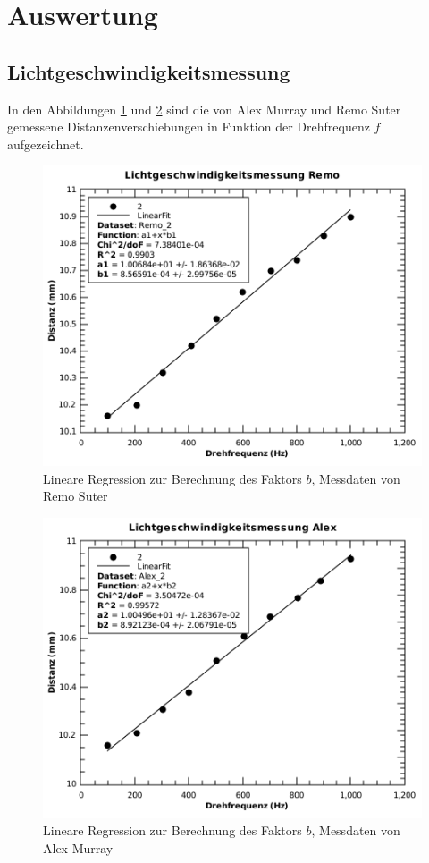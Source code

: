\section{Auswertung}

\subsection{Lichtgeschwindigkeitsmessung}

In den Abbildungen \ref{fig:x-f-remo} und \ref{fig:x-f-alex} sind die von Alex
Murray  und  Remo  Suter  gemessene Distanzenverschiebungen  in  Funktion  der
Drehfrequenz $f$ aufgezeichnet.

\begin{figure}[H]
    \center
    \includegraphics[width=.8\textwidth]{images/x-f-remo.pdf}
    \caption{Lineare Regression zur Berechnung des Faktors $b$, Messdaten von Remo Suter}
    \label{fig:x-f-remo}
\end{figure}

\begin{figure}[H]
    \center
    \includegraphics[width=.8\textwidth]{images/x-f-alex.pdf}
    \caption{Lineare Regression zur Berechnung des Faktors $b$, Messdaten von Alex Murray}
    \label{fig:x-f-alex}
\end{figure}

